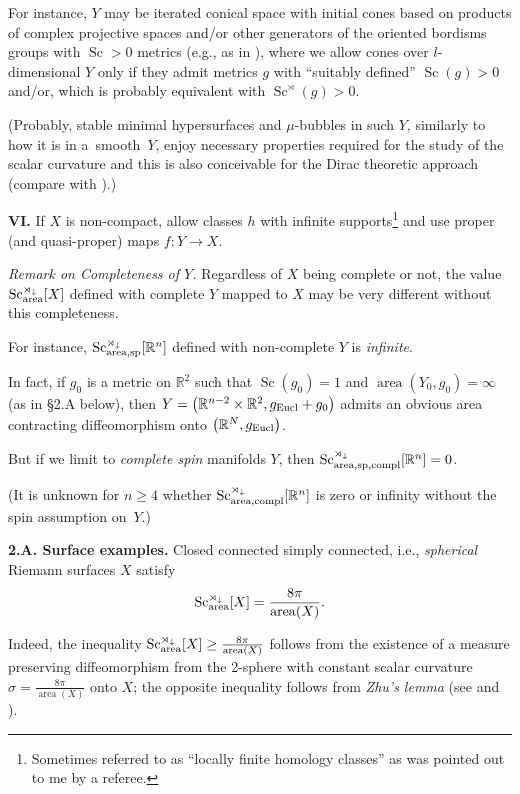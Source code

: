 \documentclass[pdftex]{sigma}
\numberwithin{equation}{section}
\begin{document}
For instance, $Y$ may be iterated conical space with initial cones based on products of complex projective spaces and/or other generators of the oriented bordisms groups with $\operatorname{Sc}>0$ metrics (e.g., as in \cite{GL1983}), where we allow cones over $l$-dimensional $Y$ only if they admit metrics $g$ with ``suitably defined'' $\operatorname{Sc}(g)>0$ and/or, which is probably equivalent with $\operatorname{Sc}^\rtimes(g) >0$.

(Probably, stable minimal hypersurfaces and $\mu$-bubbles in such $Y$, similarly to how it is in a~smooth~$Y$, enjoy necessary properties required for the study of the scalar curvature
and this is also conceivable for the Dirac theoretic approach (compare with \cite{BR2021}).)

 \textbf {VI.} If $X$ is non-compact, allow classes $h$ with infinite supports\footnote{Sometimes referred to as ``locally finite homology classes'' as was pointed out to me by a referee.} and use proper (and quasi-proper) maps $f\colon Y\to X$.

{\it Remark on Completeness of $Y$.} Regardless of $X$ being complete or not, the value $\operatorname{Sc}_{\rm area} ^{\rtimes_\downarrow}[X]$ defined with complete $Y$ mapped to $X$ may be very different without this completeness.

For instance, $\operatorname{Sc}_{\rm area,sp} ^{\rtimes_\downarrow}[\mathbb R^n]$ defined with non-complete $Y$ is {\it infinite}.

 In fact, if $g_0$ is a metric on $\mathbb R^2$ such that $\operatorname{Sc}(g_0)=1$ and
 $\operatorname{area}(Y_0,g_0)=\infty$ (as in \S2.A below), then $Y=\bigl(\mathbb R^{n-2}\times \mathbb R^2, g_{\rm Eucl}+g_0\bigr)$ admits an obvious area contracting diffeomorphism onto $\bigl(\mathbb R^N,g_{\rm Eucl}\bigr)$.


But if we limit to {\it complete spin} manifolds $Y$, then
$\operatorname{Sc}_{\rm area,sp,compl} ^{\rtimes_\downarrow}[\mathbb R^n]=0$.

(It is unknown for $n\geq 4$ whether $\operatorname{Sc}_{\rm area,compl} ^{\rtimes_\downarrow}[\mathbb R^n]$ is zero or infinity without the spin assumption on~$Y$.)

\textbf{2.A. Surface examples.}
 Closed connected simply connected, i.e., {\it spherical} Riemann surfaces $X$ satisfy
\[
\operatorname{Sc}_{\rm area}^{\rtimes_\downarrow}[X]=\frac {8\pi} {\operatorname{area}(X)}.
\]

Indeed, the inequality $\operatorname{Sc}_{\rm area}^{\rtimes_\downarrow}[X]\geq\frac {8\pi} {\operatorname{area}(X)}$
follows from the existence of a measure preserving diffeomorphism from the 2-sphere with constant scalar curvature $\sigma=\frac{8\pi}{\operatorname{area}(X)}$ onto $X$;
 the opposite inequality follows from {\it Zhu's lemma} (see \cite{Zhu2019} and \cite[Section~2.8]{Gr2021}).
\end{document}
